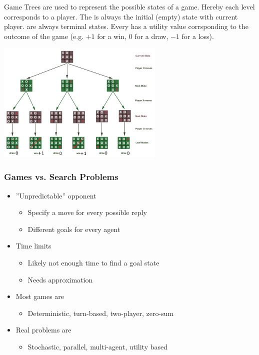 \documentclass[
../../EiKI_Summary.tex,
]
{subfiles}
\begin{document}
\begin{defbox}
    Game Trees are used to represent the possible states of a game. Hereby each level corresponds to a player. The  is always the initial (empty) state with current player.  are always terminal states. Every  has a utility value corrsponding to the outcome of the game (e.g. $+1$ for a win, $0$ for a draw, $-1$ for a loss).

    \begin{center}
        \includegraphics[width=0.6\textwidth]{Pics/04/TicTacToeGameTree.png}
    \end{center}
\end{defbox}

\subsubsection{Games vs. Search Problems}
\begin{itemize}
    \item ''Unpredictable'' opponent
    \begin{itemize}
        \item Specify a move for every possible reply
        \item Different goals for every agent
    \end{itemize}
    \item Time limits
    \begin{itemize}
        \item Likely not enough time to find a goal state
        \item Needs approximation
    \end{itemize}
    \item Most games are
    \begin{itemize}
        \item Deterministic, turn-based, two-player, zero-sum
    \end{itemize}
    \item Real problems are
    \begin{itemize}
        \item Stochastic, parallel, multi-agent, utility based
    \end{itemize}
\end{itemize}
\end{document}

